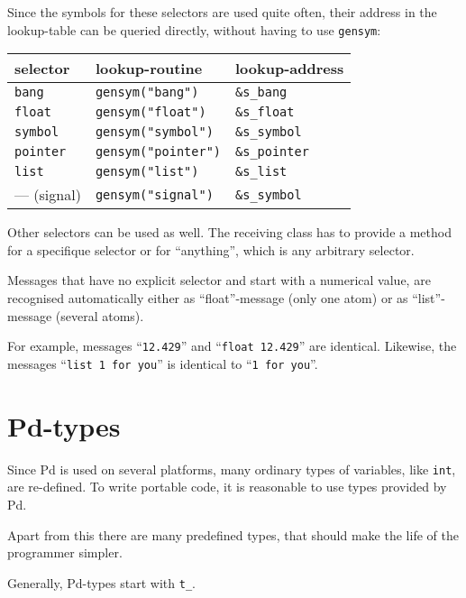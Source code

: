 \documentclass[12pt, a4paper,english,titlepage]{article}
\begin{document}
\begin{appendix}
Since the symbols for these selectors are used quite often,
their address in the lookup-table can be queried directly,
without having to use \verb+gensym+:

\begin{tabular}{l||l|l}
selector&lookup-routine&lookup-address\\
\hline
\tt bang &\verb+gensym("bang")+ & \verb+&s_bang+ \\
\tt float &\verb+gensym("float")+ & \verb+&s_float+ \\
\tt symbol &\verb+gensym("symbol")+ & \verb+&s_symbol+ \\
\tt pointer &\verb+gensym("pointer")+ & \verb+&s_pointer+ \\
\tt list &\verb+gensym("list")+ & \verb+&s_list+ \\
--- (signal) &\verb+gensym("signal")+&\verb+&s_symbol+
\end{tabular}

Other selectors can be used as well.
The receiving class has to provide a method for a specifique selector
or for ``anything'', which is any arbitrary selector.

Messages that have no explicit selector and start with a numerical value,
are recognised automatically either as ``float''-message (only one atom) or as
``list''-message (several atoms).

For example, messages ``\verb+12.429+'' and ``\verb+float 12.429+'' are identical.
Likewise, the messages ``\verb+list 1 for you+'' is identical to ``\verb+1 for you+''.

\section{Pd-types}
Since Pd is used on several platforms,
many ordinary types of variables, like \verb|int|, are re-defined.
To write portable code, it is reasonable to use types provided by Pd.

Apart from this there are many predefined types,
that should make the life of the programmer simpler.

Generally, Pd-types start with \verb|t_|.


\end{appendix}
\end{document}
